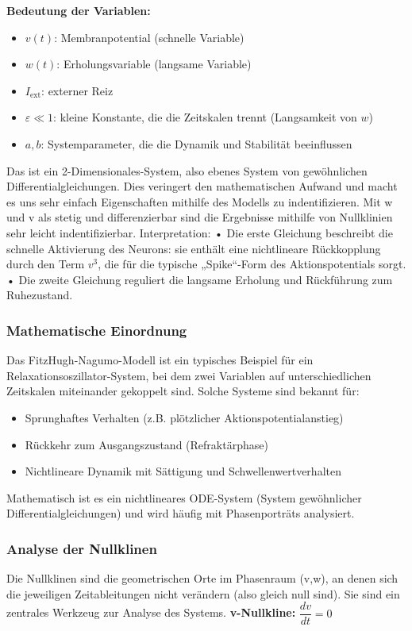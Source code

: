\begin{refsection}
\textbf{Bedeutung der Variablen:}

\begin{itemize}
	\item $v(t)$: Membranpotential (schnelle Variable)
	\item $w(t)$: Erholungsvariable (langsame Variable)
	\item $I_{\text{ext}}$: externer Reiz
	\item $\varepsilon \ll 1$: kleine Konstante, die die Zeitskalen trennt (Langsamkeit von $w$)
	\item $a, b$: Systemparameter, die die Dynamik und Stabilität beeinflussen
\end{itemize}
Das ist ein 2-Dimensionales-System, also ebenes System von gewöhnlichen Differentialgleichungen. Dies veringert den mathematischen Aufwand und macht es uns sehr einfach Eigenschaften mithilfe des Modells zu indentifizieren.
Mit w und v als stetig und differenzierbar sind die Ergebnisse mithilfe von Nullklinien sehr leicht indentifizierbar.
Interpretation:
•	Die erste Gleichung beschreibt die schnelle Aktivierung des Neurons: sie enthält eine nichtlineare Rückkopplung durch den Term $v^3$, die für die typische „Spike“-Form des Aktionspotentials sorgt.
•	Die zweite Gleichung reguliert die langsame Erholung und Rückführung zum Ruhezustand.
\subsubsection{Mathematische Einordnung}
Das FitzHugh-Nagumo-Modell ist ein typisches Beispiel für ein Relaxationsoszillator-System, bei dem zwei Variablen auf
unterschiedlichen Zeitskalen miteinander gekoppelt sind. Solche Systeme sind bekannt für:
\begin{itemize}
    \item Sprunghaftes Verhalten (z.B. plötzlicher Aktionspotentialanstieg)
    \item Rückkehr zum Ausgangszustand (Refraktärphase)
    \item Nichtlineare Dynamik mit Sättigung und Schwellenwertverhalten
\end{itemize}
Mathematisch ist es ein nichtlineares ODE-System (System gewöhnlicher Differentialgleichungen) und wird häufig mit Phasenporträts analysiert.
\subsubsection{Analyse der Nullklinen}
Die Nullklinen sind die geometrischen Orte im Phasenraum (v,w), an denen sich die jeweiligen Zeitableitungen nicht verändern (also gleich null sind). Sie sind ein zentrales Werkzeug zur Analyse des Systems.
\textbf{v-Nullkline:} $\dfrac{dv}{dt} = 0$


\end{refsection}
